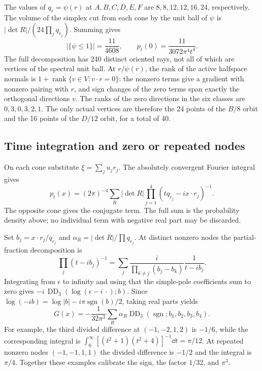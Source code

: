 \documentclass[11pt,a4paper]{article}
\theoremstyle{remark}\newtheorem{remark}[theorem]{Remark}
\newcommand{\1}{\mathbf1}\newcommand{\pos}[1]{(#1)_+}
\DeclareMathOperator{\sgn}{sgn}\DeclareMathOperator{\rank}{rank}
\begin{document}
The values of $q_r=\psi(r)$ at $A,B,C,D,E,F$ are $8,8,12,12,16,24$, respectively. The volume of the simplex cut from each cone by the unit ball of $\psi$ is $|\det R|/(24\prod_jq_{r_j})$. Summing gives
\begin{equation}\label{eq:peak}
 |\{\psi\le1\}|=\frac{11}{4608},\qquad p_t(0)=\frac{11}{3072\pi^4t^4}.
\end{equation}
The full decomposition has 240 distinct oriented rays, not all of which are vertices of the spectral unit ball. At $r/\psi(r)$, the rank of the active halfspace normals is $1+\rank\{v\in V:v\cdot r=0\}$: the nonzero terms give a gradient with nonzero pairing with $r$, and sign changes of the zero terms span exactly the orthogonal directions $v$. The ranks of the zero directions in the six classes are $0,3,0,3,2,1$. The only actual vertices are therefore the 24 points of the $B/8$ orbit and the 16 points of the $D/12$ orbit, for a total of 40.

\subsection{Time integration and zero or repeated nodes}
On each cone substitute $\xi=\sum_j u_jr_j$. The absolutely convergent Fourier integral gives
\begin{equation}\label{eq:ptcones}
 p_t(x)=(2\pi)^{-4}\sum_R|\det R|\prod_{j=1}^4(tq_{r_j}-ix\cdot r_j)^{-1}.
\end{equation}
The opposite cone gives the conjugate term. The full sum is the probability density above; no individual term with negative real part may be discarded.

Set $b_j=x\cdot r_j/q_{r_j}$ and $\alpha_R=|\det R|/\prod q_{r_j}$. At distinct nonzero nodes the partial-fraction decomposition is
\[
 \prod_j(t-ib_j)^{-1}=\sum_j\frac{i}{\prod_{k\ne j}(b_j-b_k)}\frac1{t-ib_j}.
\]
Integrating from $\epsilon$ to infinity and using that the simple-pole coefficients sum to zero gives $-i\,\operatorname{DD}_3(\log(\epsilon-i\,\cdot);b)$. Since
$\log(-ib)=\log|b|-i\pi\sgn(b)/2$, taking real parts yields
\begin{equation}\label{eq:DD}
 G(x)=-\frac1{32\pi^3}\sum_R\alpha_R
 \operatorname{DD}_3(\sgn;b_1,b_2,b_3,b_4).
\end{equation}
For example, the third divided difference at $(-1,-2,1,2)$ is $-1/6$, while the corresponding integral is $\int_0^\infty[(t^2+1)(t^2+4)]^{-1}\dd t=\pi/12$. At repeated nonzero nodes $(-1,-1,1,1)$ the divided difference is $-1/2$ and the integral is $\pi/4$. Together these examples calibrate the sign, the factor $1/32$, and $\pi^3$.
\end{document}
